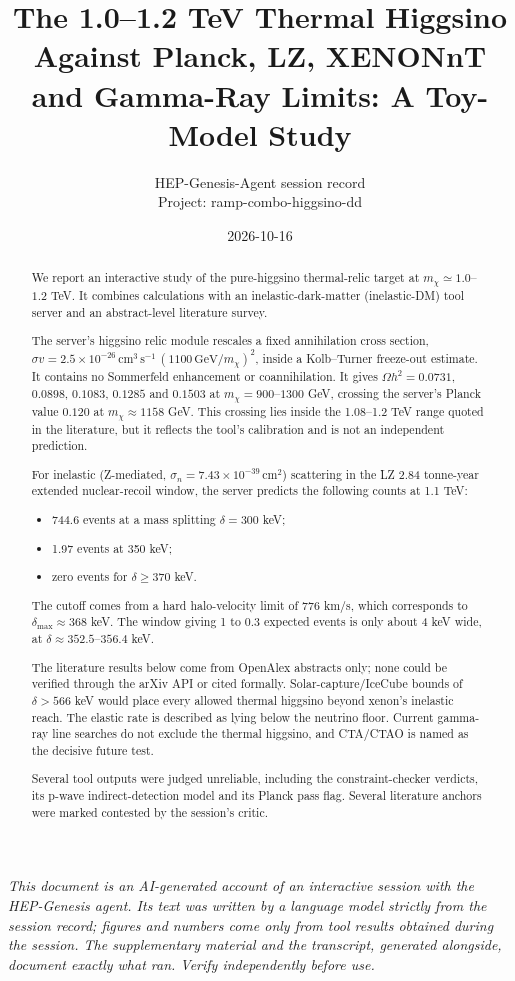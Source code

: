 \documentclass[11pt,a4paper]{article}
\title{The 1.0--1.2 TeV Thermal Higgsino Against Planck, LZ, XENONnT and Gamma-Ray Limits: A Toy-Model Study}
\author{HEP-Genesis-Agent session record \\ \small Project: ramp-combo-higgsino-dd}
\date{2026-10-16}
\begin{document}
\maketitle
\noindent\textit{\small This document is an AI-generated account of an interactive session with the HEP-Genesis agent. Its text was written by a language model strictly from the session record; figures and numbers come only from tool results obtained during the session. The supplementary material and the transcript, generated alongside, document exactly what ran. Verify independently before use.}
\vspace{1em}

\begin{abstract}
We report an interactive study of the pure-higgsino thermal-relic target at $m_\chi \simeq 1.0$--$1.2$ TeV. It combines calculations with an inelastic-dark-matter (inelastic-DM) tool server and an abstract-level literature survey.

The server's higgsino relic module rescales a fixed annihilation cross section, $\sigma v = 2.5\times10^{-26}\,\mathrm{cm^3\,s^{-1}}\,(1100\,\mathrm{GeV}/m_\chi)^2$, inside a Kolb--Turner freeze-out estimate. It contains no Sommerfeld enhancement or coannihilation. It gives $\Omega h^2 = 0.0731$, $0.0898$, $0.1083$, $0.1285$ and $0.1503$ at $m_\chi = 900$--$1300$ GeV, crossing the server's Planck value $0.120$ at $m_\chi \approx 1158$ GeV. This crossing lies inside the 1.08--1.2 TeV range quoted in the literature, but it reflects the tool's calibration and is not an independent prediction.

For inelastic (Z-mediated, $\sigma_n = 7.43\times10^{-39}\,\mathrm{cm^2}$) scattering in the LZ 2.84 tonne-year extended nuclear-recoil window, the server predicts the following counts at 1.1 TeV:
\begin{itemize}
\item 744.6 events at a mass splitting $\delta = 300$ keV;
\item 1.97 events at 350 keV;
\item zero events for $\delta \geq 370$ keV.
\end{itemize}
The cutoff comes from a hard halo-velocity limit of 776 km/s, which corresponds to $\delta_{\max} \approx 368$ keV. The window giving 1 to 0.3 expected events is only about 4 keV wide, at $\delta \approx 352.5$--$356.4$ keV.

The literature results below come from OpenAlex abstracts only; none could be verified through the arXiv API or cited formally. Solar-capture/IceCube bounds of $\delta > 566$ keV would place every allowed thermal higgsino beyond xenon's inelastic reach. The elastic rate is described as lying below the neutrino floor. Current gamma-ray line searches do not exclude the thermal higgsino, and CTA/CTAO is named as the decisive future test.

Several tool outputs were judged unreliable, including the constraint-checker verdicts, its p-wave indirect-detection model and its Planck pass flag. Several literature anchors were marked contested by the session's critic.
\end{abstract}
\end{document}
